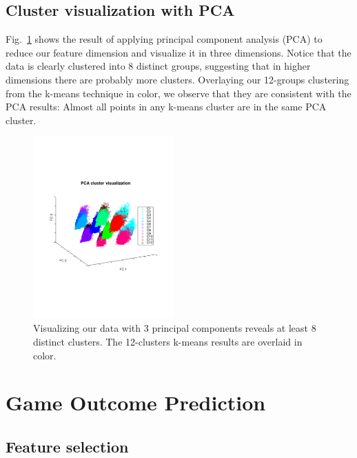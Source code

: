 \documentclass[letterpaper,10 pt,conference]{ieeeconf}
\begin{document}
\subsection{Cluster visualization with PCA}

Fig.~\ref{fig:viz} shows the result of applying principal component analysis (PCA) to reduce our feature dimension and visualize it in three dimensions. Notice that the data is clearly clustered into 8 distinct groups, suggesting that in higher dimensions there are probably more clusters. Overlaying our 12-groups clustering from the k-means technique in color, we observe that they are consistent with the PCA results: Almost all points in any k-means cluster are in the same PCA cluster. 

\begin{figure}[htbp!]
  \centering
  \includegraphics[trim=70pt 210pt 70pt 250pt, clip, width=0.48\textwidth]{viz-cluster.pdf}
  \caption{Visualizing our data with 3 principal components reveals at least 8 distinct clusters. The 12-clusters k-means results are overlaid in color.}
  \label{fig:viz}
\end{figure}

\section{Game Outcome Prediction}



\subsection{Feature selection}
\end{document}
